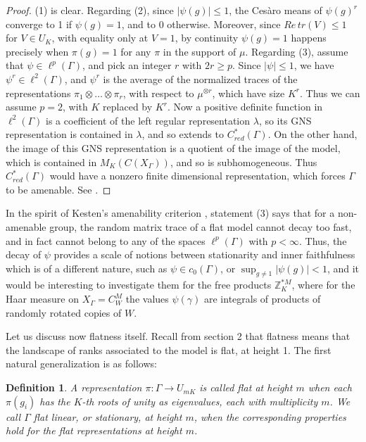 \documentclass[12pt]{amsart}
\newtheorem{definition}[theorem]{Definition}
\theoremstyle{definition}
\begin{document}
\begin{proof}
(1) is clear. Regarding (2), since $|\psi(g)|\leq1$, the Ces\`aro means of $\psi(g)^r$ converge to 1 if $\psi(g)=1$, and to 0 otherwise. Moreover, since $Re\,tr(V)\leq1$ for $V\in U_K$, with equality only at $V=1$, by continuity $\psi(g)=1$ happens precisely when $\pi(g)=1$ for any $\pi$ in the support of $\mu$. Regarding (3), assume that $\psi\in\ell^p(\Gamma)$, and pick an integer $r$ with $2r\geq p$. Since $|\psi|\leq1$, we have $\psi^r\in\ell^2(\Gamma)$, and $\psi^r$ is the average of the normalized traces of the representations $\pi_1\otimes\ldots\otimes\pi_r$, with respect to $\mu^{\otimes r}$, which have size $K^r$. Thus we can assume $p=2$, with $K$ replaced by $K^r$. Now a positive definite function in $\ell^2(\Gamma)$ is a coefficient of the left regular representation $\lambda$, so its GNS representation is contained in $\lambda$, and so extends to $C^*_{red}(\Gamma)$. On the other hand, the image of this GNS representation is a quotient of the image of the model, which is contained in $M_K(C(X_\Gamma))$, and so is subhomogeneous. Thus $C^*_{red}(\Gamma)$ would have a nonzero finite dimensional representation, which forces $\Gamma$ to be amenable. See \cite{bo}.
\end{proof}

In the spirit of Kesten's amenability criterion \cite{kes}, statement (3) says that for a non-amenable group, the random matrix trace of a flat model cannot decay too fast, and in fact cannot belong to any of the spaces $\ell^p(\Gamma)$ with $p<\infty$. Thus, the decay of $\psi$ provides a scale of notions between stationarity and inner faithfulness which is of a different nature, such as $\psi\in c_0(\Gamma)$, or $\sup_{g\neq1}|\psi(g)|<1$, and it would be interesting to investigate them for the free products $\mathbb Z_K^{*M}$, where for the Haar measure on $X_\Gamma=C_W^M$ the values $\psi(\gamma)$ are integrals of products of randomly rotated copies of $W$.

Let us discuss now flatness itself. Recall from section 2 that flatness means that the landscape of ranks associated to the model is flat, at height 1. The first natural generalization is as follows:

\begin{definition}
A representation $\pi:\Gamma\to U_{mK}$ is called flat at height $m$ when each $\pi(g_i)$ has the $K$-th roots of unity as eigenvalues, each with multiplicity $m$. We call $\Gamma$ flat linear, or stationary, at height $m$, when the corresponding properties hold for the flat representations at height $m$.
\end{definition}
\end{document}
